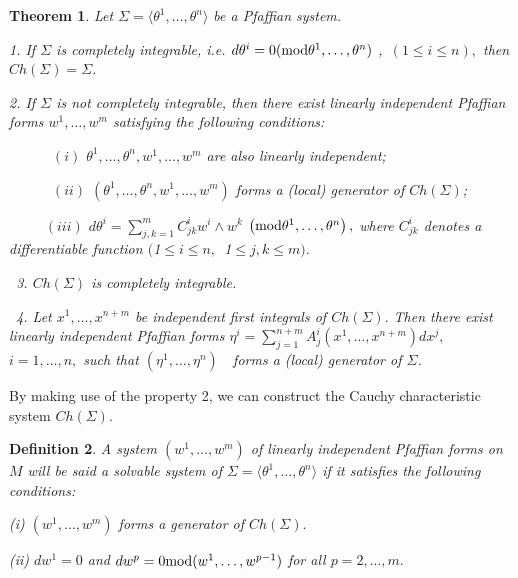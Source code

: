 \documentclass{amsproc}
\newtheorem{theorem}{Theorem}[section]
\newtheorem{definition}[theorem]{Definition}
\theoremstyle{remark}
\numberwithin{equation}{section}
\begin{document}
\begin{theorem}\label{theo:cartan}
Let $\Sigma =\langle \theta ^{1},\ldots ,\theta ^{n}\rangle $ be a Pfaffian
system.

1. If $\Sigma $ is completely integrable, i.e. $d\theta ^{i}=0({\mathop{\mbox{\rm {mod}}}}\theta ^{1},\ldots ,\theta ^{n})$ ,\ $\left( 1\leq i\leq n\right) ,$ then $Ch(\Sigma )=\Sigma$. \ \ \ \ \

2. If $\Sigma $ \textit{is not completely integrable, then there exist
linearly independent Pfaffian forms }$w^{1},\ldots ,w^{m}$ \textit{satisfying the following conditions:}\ \ 

\ \ \ \ \ \ $(i)$ $\theta ^{1},\ldots ,\theta ^{n},w^{1},\ldots ,w^{m}$ 
\textit{are also linearly independen}t;\ \ 

\ \ \ \ \ \ $(ii)$ $(\theta ^{1},\ldots ,\theta ^{n},w^{1},\ldots ,w^{m})$ 
\textit{forms a (local) generator of }$Ch(\Sigma )$;

\ \ \ \ \ $(iii)$ $d\theta^{i}=
\displaystyle{\sum\limits_{j,k=1}^{m}}C_{jk}^{i}w^{i}\wedge w^{k}$ $\left( {\mathop{\mbox{\rm {mod}}}}\theta ^{1},\ldots ,\theta ^{n}\right) ,$ \textit{where }$C_{jk}^{i}$ 
\textit{denotes a differentiable function }$($\textit{1}$\leq i\leq n,$\textit{\ 1}$\leq j,k\leq m).$\textit{\ }

\ \textit{3. }$Ch(\Sigma )$ \textit{is completely integrable. \ }

\ \textit{4. Let }$x^{1},\ldots ,x^{n+m}$ \textit{be independent first
integrals of} $Ch(\Sigma ).$ \textit{Then there exist linearly independent
Pfaffian forms} $\eta ^{i}={\displaystyle\sum\limits_{j=1}^{n+m}}A_{j}^{i}(x^{1},\ldots
,x^{n+m})dx^{j},$ $i=1,\ldots ,n,$ \textit{such that} $(\eta ^{1},\ldots
,\eta ^{n})$\ \ forms a (local) generator of $\Sigma$.
\end{theorem}

By making use of the property 2, we can construct the Cauchy characteristic
system $Ch(\Sigma)$.

\begin{definition}
\textit{A system }$(w^{1},\ldots ,w^{m})$ \textit{of linearly independent
Pfaffian forms on }$M$ \textit{will be said a solvable system of }$\Sigma
=\langle \theta ^{1},\ldots ,\theta ^{n}\rangle $ \textit{if it satisfies
the following conditions:}

\textit{(i) }$(w^{1},\ldots ,w^{m})$ \textit{forms a generator of }$Ch(\Sigma ).$

(ii) $dw^{1}=0$ \textit{and }$dw^{p}=0{\mathop{\mbox{\rm {mod}}}}(w^{1},\ldots ,w^{p-1})$ for
all $p=2,\ldots ,m.$
\end{definition}
\end{document}
